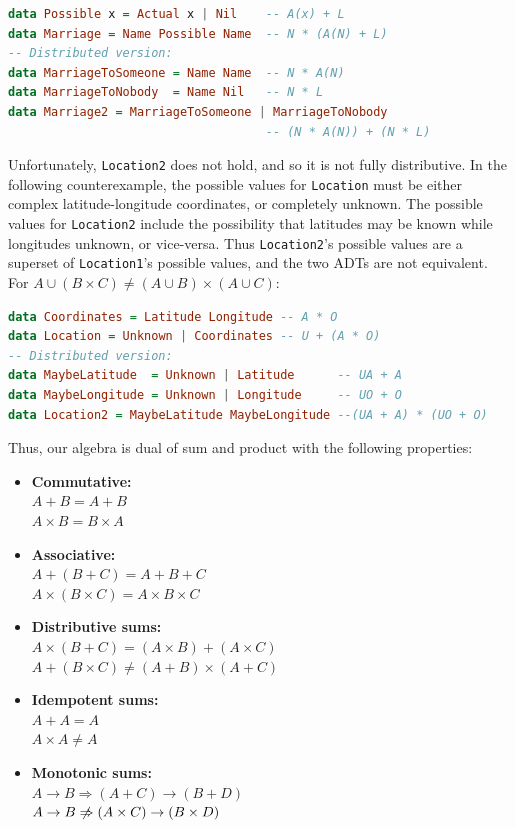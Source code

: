 \documentclass[12pt,a4paper]{article}
\begin{document}
		\begin{lstlisting}[language=Haskell]
data Possible x = Actual x | Nil    -- A(x) + L
data Marriage = Name Possible Name  -- N * (A(N) + L)
-- Distributed version:
data MarriageToSomeone = Name Name  -- N * A(N)
data MarriageToNobody  = Name Nil   -- N * L
data Marriage2 = MarriageToSomeone | MarriageToNobody 
                                    -- (N * A(N)) + (N * L)
		\end{lstlisting}
	
		Unfortunately, \texttt{Location2} does not hold, and so it is not fully distributive. In the following counterexample, the possible values for \texttt{Location} must be either complex latitude-longitude coordinates, or completely unknown. The possible values for \texttt{Location2} include the possibility that latitudes may be known while longitudes unknown, or vice-versa. Thus \texttt{Location2}'s possible values are a superset of \texttt{Location1}'s possible values, and the two ADTs are not equivalent. For $ A \cup (B \times C) \neq (A \cup B) \times (A \cup C)$:
		
		\begin{lstlisting}[language=Haskell]
data Coordinates = Latitude Longitude -- A * O
data Location = Unknown | Coordinates -- U + (A * O)
-- Distributed version:
data MaybeLatitude  = Unknown | Latitude      -- UA + A
data MaybeLongitude = Unknown | Longitude     -- UO + O
data Location2 = MaybeLatitude MaybeLongitude --(UA + A) * (UO + O)
		\end{lstlisting}
	
		Thus, our algebra is dual of sum and product with the following properties:
		
		\begin{itemize}
			\item \textbf{Commutative:} 
			\\ $A + B = A + B$
			\\ $A \times B = B \times A $
			\item \textbf{Associative:} 
			\\ $A + (B + C) = A + B + C$
			\\ $A \times (B \times C) = A \times B \times C$
			\item \textbf{Distributive sums:} 
			\\ $ A \times (B + C) = (A \times B) + (A \times C)$
			\\ $ A + (B \times C) \neq (A + B) \times (A + C)$
			\item \textbf{Idempotent sums:}
			\\ $ A + A = A $
			\\ $ A \times A \neq A $
			\item \textbf{Monotonic sums:}
			\\ $ A \rightarrow B \Rightarrow (A + C) \rightarrow (B + D) $
			\\ $ A \rightarrow B \centernot\Rightarrow (A \times C) \rightarrow (B \times D) $
		\end{itemize}
	
\end{document}
